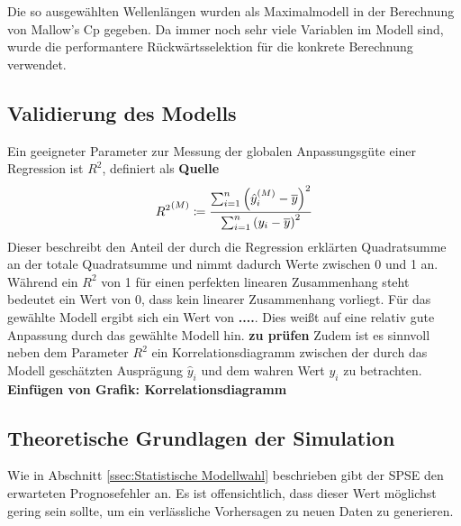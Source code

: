 
	Die so ausgewählten Wellenlängen wurden als Maximalmodell in der Berechnung von Mallow's Cp gegeben. Da immer noch sehr viele Variablen im Modell sind, wurde die performantere Rückwärtsselektion für die konkrete Berechnung verwendet.


	\subsection{Validierung des Modells}
	\label{ssec:model-validation}
			Ein geeigneter Parameter zur Messung der globalen Anpassungsgüte einer Regression ist $R^2$, definiert als \textbf{Quelle}
			\[
					{R^2}^{(M)} \coloneqq \frac {\sum_{i=1}^n \left( \hat{y}^{(M)}_i - \overline{y} \right)^2}{\sum_{i=1}^n \left( y_i - \overline{y} \right)^2}
			\]
			Dieser beschreibt den Anteil der durch die Regression erklärten Quadratsumme an der totale Quadratsumme und nimmt dadurch Werte zwischen 0 und 1 an.
			Während ein $R^2$ von 1 für einen perfekten linearen Zusammenhang steht bedeutet ein Wert von 0, dass kein linearer Zusammenhang vorliegt.
			Für das gewählte Modell ergibt sich ein Wert von \textbf{....}.
			Dies weißt auf eine relativ gute Anpassung durch das gewählte Modell hin. \textbf{zu prüfen}
			Zudem ist es sinnvoll neben dem Parameter $R^2$ ein Korrelationsdiagramm zwischen der durch das Modell geschätzten Ausprägung $\hat{y}_i$ und dem wahren Wert $y_i$ zu betrachten.
			\textbf{Einfügen von Grafik: Korrelationsdiagramm}






	\subsection{Theoretische Grundlagen der Simulation}
	\label{ssec:Theoretische Grundlagen der Simulation}

        Wie in Abschnitt \ref{ssec:Statistische Modellwahl} beschrieben gibt der SPSE den erwarteten Prognosefehler an.
        Es ist offensichtlich, dass dieser Wert möglichst gering sein sollte, um ein verlässliche Vorhersagen zu neuen Daten zu generieren.

